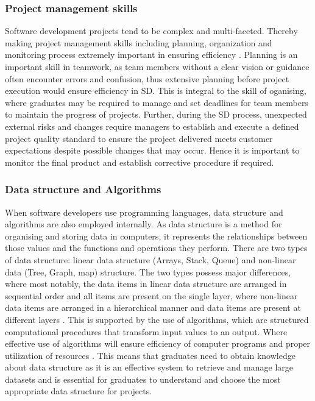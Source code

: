 \documentclass[a4paper, 11pt]{report}
\begin{document}
\subsubsection{Project management skills}
Software development projects tend to be complex and multi-faceted. Thereby making project management skills including planning, organization and monitoring process extremely important in ensuring efficiency \cite{Orasesnd}. Planning is an important skill in teamwork, as team members without a clear vision or guidance often encounter errors and confusion, thus extensive planning before project execution would ensure efficiency in SD. This is integral to the skill of oganising, where graduates may be required to manage and set deadlines for team members to maintain the progress of projects. Further, during the SD process, unexpected external risks and changes require managers to establish and execute a defined project quality standard to ensure the project delivered meets customer expectations despite possible changes that may occur. Hence it is important to monitor the final product and establish corrective procedure if required.
 
\subsubsection{Data structure and Algorithms}
When software developers use programming languages, data structure and algorithms are also employed internally. As data structure is a method for organising and storing data in computers, it represents the relationships between those values and the functions and operations they perform. There are two types of data structure: linear data structure (Arrays, Stack, Queue) and non-linear data (Tree, Graph, map) structure. The two types possess major differences, where most notably, the data items in linear data structure are arranged in sequential order and all items are present on the single layer, where non-linear data items are arranged in a hierarchical manner and data items are present at different layers \cite{Programiznd}. This is supported by the use of algorithms, which are structured computational procedures that transform input values to an output. Where effective use of algorithms will ensure efficiency of computer programs and proper utilization of resources \cite{Mulongo2022}. This means that graduates need to obtain knowledge about data structure as it is an effective system to retrieve and manage large datasets and is essential for graduates to understand and choose the most appropriate data structure for projects. 
\end{document}
